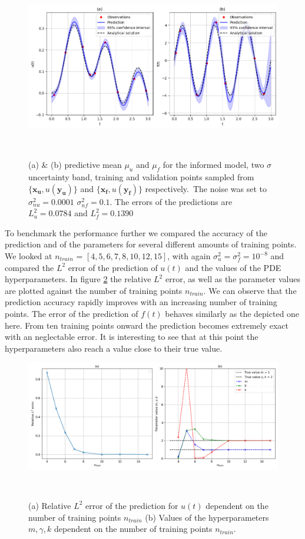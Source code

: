 \documentclass{article}
\begin{document}
\begin{figure}[htbp!]
    \centering
    \includegraphics[width=1\textwidth]{../final_examples/oscillator/oscillator_noise.png}
    \caption{(a) \& (b) predictive mean $\mu_u$ and $\mu_f$ for the informed model, two $\sigma$ uncertainty band, training and validation points sampled from $\{\bm{x_u},u(\bm{y_u})\}$ and $\{\bm{x_f},u(\bm{y_f})\}$ respectively.\ The noise was set to $\sigma_{nu}^2 = 0.0001$  $\sigma_{nf}^2 = 0.1$. The errors of the predictions are $L^2_u = 0.0784 $ and $L^2_f = 0.1390$}
    ~\label{fig:damped_oscillator_with_noise}
\end{figure}
To benchmark the performance further we compared the accuracy of the prediction and of the parameters for several different amounts of training points. We looked at $n_{train}$ = $\left[4,5,6,7,8,10,12,15\right]$, with again $\sigma^2_u = \sigma^2_f = 10^{-8}$ and compared the $L^2$ error of the prediction of $u(t)$ and the values of the PDE hyperparameters. In figure \ref{fig:damped_oscillator_L2} the relative $L^2$ error, as well as the parameter values are plotted against the number of training points $n_{train}$. We can observe that the prediction accuracy rapidly improves with an increasing number of training points. The error of the prediction of $f(t)$ behaves similarly as the depicted one here. From ten training points onward the prediction becomes extremely exact with an neglectable error. It is interesting to see that at this point the hyperparameters also reach a value close to their true value. 
\begin{figure}[htbp!]
    \centering
    \includegraphics[width=1\textwidth]{../final_examples/oscillator/l2_error.png}
    \caption{(a) Relative $L^2$ error of the prediction for $u(t)$ dependent on the number of training points $n_{train}$ (b) Values of the hyperparameters $m,\gamma, k$ dependent on the number of training points $n_{train}$.}
    ~\label{fig:damped_oscillator_L2}
\end{figure}
\end{document}
